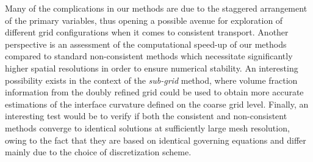 Many of the complications in our methods are due to the staggered arrangement of the primary variables, 
thus opening a possible avenue for exploration of different grid configurations when it comes to consistent transport.
Another perspective is an assessment of the computational speed-up 
of our methods compared to standard non-consistent methods which necessitate 
significantly higher spatial resolutions in order to ensure numerical stability.  
An interesting possibility exists in the context of the \textit{sub-grid} method, 
where volume fraction information from the doubly refined grid could be used to
obtain more accurate estimations of the interface curvature defined on the coarse grid level. 
Finally, an interesting test would be to verify if both the consistent and non-consistent methods
converge to identical solutions at sufficiently large mesh resolution, owing to the fact that they 
are based on identical governing equations and differ mainly due to the choice of discretization scheme. 



